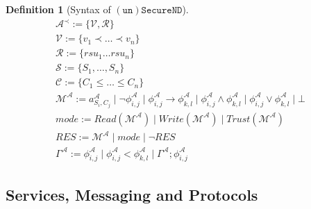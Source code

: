 \documentclass[compsoc, conference, letterpaper, 10pt, times]{IEEEtran}
\newtheorem{definition}{Definition}
\begin{document}
\begin{definition}[Syntax of $\mathtt{(un)SecureND}$]\label{def:syntax} %
	\begin{displaymath}
	\begin{array}{l}
	\mathcal{A}^{\prec}:= \{\mathcal{V, R}\}\\
	\mathcal{V}:= \{v_{1}\prec \ldots \prec v_{n}\}\\
	\mathcal{R}:= \{rsu_{1}\ldots rsu_{n}\}\\
	\mathcal{S}:= \{S_1, \dots, S_{n}\}\\  %
	\mathcal{C}:= \{C_{1}\leq \dots \leq C_{n}\}\\  %
	\mathcal{M^{\mathcal{A}}}:= a^{\mathcal{A}}_{S_{i},C_{j}}\mid \neg \phi^{\mathcal{A}}_{i,j}\mid \phi^{\mathcal{A}}_{i,j}\rightarrow \phi^{\mathcal{A}}_{k,l}\mid \phi^{\mathcal{A}}_{i,j}\wedge \phi^{\mathcal{A}}_{k,l}\mid \phi^{\mathcal{A}}_{i,j}\vee \phi^{\mathcal{A}}_{k,l} \mid \bot\\
	mode:= Read(\mathcal{M}^{\mathcal{A}})\mid Write(\mathcal{M}^{\mathcal{A}})\mid Trust(\mathcal{M}^{\mathcal{A}})\\
	RES:= \mathcal{M}^{\mathcal{A}}\mid mode\mid \neg RES\\
	\Gamma^{\mathcal{A}}:= 
	\phi^{\mathcal{A}}_{i,j} \mid \phi^{\mathcal{A}}_{i,j} < \phi^{\mathcal{A}}_{k,l} \mid \Gamma^{\mathcal{A}}; \phi^{\mathcal{A}}_{i,j}
	
	\end{array}
	\end{displaymath}
\end{definition}
%

\subsection{Services, Messaging and Protocols}
\end{document}
